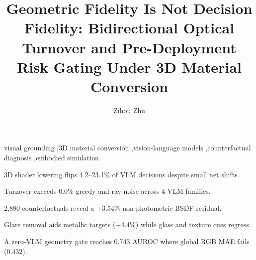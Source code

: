 \documentclass[5p,times,authoryear]{elsarticle}
\begin{document}
\begin{frontmatter}
\title{Geometric Fidelity Is Not Decision Fidelity: Bidirectional Optical Turnover and Pre-Deployment Risk Gating Under 3D Material Conversion}
\author[shlab]{Zihou Zhu}
\address[shlab]{Shanghai Artificial Intelligence Laboratory, Shanghai, China}
\begin{abstract}

\end{abstract}
\begin{keyword}visual grounding \sep 3D material conversion \sep vision-language models \sep counterfactual diagnosis \sep embodied simulation\end{keyword}
\begin{highlights}
\item 3D shader lowering flips 4.2--23.1\% of VLM decisions despite small net shifts.
\item Turnover exceeds 0.0\% greedy and ray noise across 4 VLM families.
\item 2,880 counterfactuals reveal a +3.54\% non-photometric BSDF residual.
\item Glare removal aids metallic targets (+4.4\%) while glass and texture cues regress.
\item A zero-VLM geometry gate reaches 0.743 AUROC where global RGB MAE fails (0.432).
\end{highlights}
\end{frontmatter}










\clearpage\appendix

\end{document}
